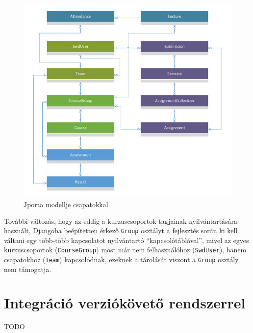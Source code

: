 \begin{figure}[h]
    \centering
    \includegraphics[width=\textwidth]{figures/teams-after}
    \caption{Jporta modellje csapatokkal}
    \label{figure:teams-after}
\end{figure}

További változás, hogy az eddig a kurzuscsoportok tagjainak nyilvántartására használt, Djangoba beépítetten érkező \texttt{Group} osztályt a fejlesztés során ki kell váltani egy több-több kapcsolatot nyilvántartó ``kapcsolótáblával'', mivel az egyes kurzuscsoportok (\texttt{CourseGroup}) most már nem felhasználóhoz (\texttt{SwdUser}), hanem csapatokhoz (\texttt{Team}) kapcsolódnak, ezeknek a tárolását viszont a \texttt{Group} osztály nem támogatja.

\section{Integráció verziókövető rendszerrel}
TODO